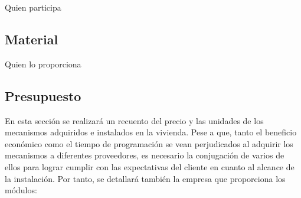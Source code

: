 Quien participa

\subsection{Material}

Quien lo proporciona

\subsection{Presupuesto}

En esta sección se realizará un recuento del precio y las unidades de los mecanismos adquiridos e instalados en la vivienda. Pese a que, tanto el beneficio económico como el tiempo de programación se vean perjudicados al adquirir los mecanismos a diferentes proveedores, es necesario la conjugación de varios de ellos para lograr cumplir con las expectativas del cliente en cuanto al alcance de la instalación. Por tanto, se detallará también la empresa que proporciona los módulos:

